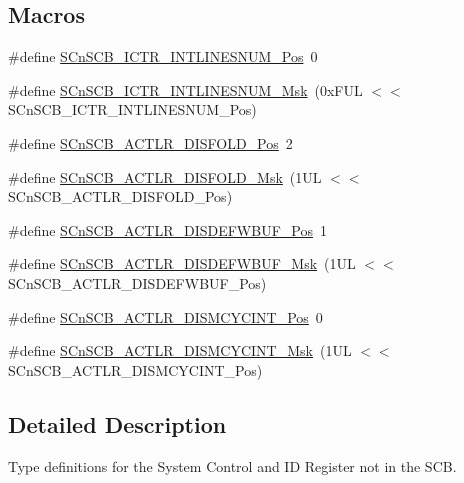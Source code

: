 \subsection*{Macros}
\begin{DoxyCompactItemize}
\item 
\#define \hyperlink{group__CMSIS__SCnSCB_ga0777ddf379af50f9ca41d40573bfffc5}{S\-Cn\-S\-C\-B\-\_\-\-I\-C\-T\-R\-\_\-\-I\-N\-T\-L\-I\-N\-E\-S\-N\-U\-M\-\_\-\-Pos}~0
\item 
\#define \hyperlink{group__CMSIS__SCnSCB_ga3efa0f5210051464e1034b19fc7b33c7}{S\-Cn\-S\-C\-B\-\_\-\-I\-C\-T\-R\-\_\-\-I\-N\-T\-L\-I\-N\-E\-S\-N\-U\-M\-\_\-\-Msk}~(0x\-F\-U\-L $<$$<$ S\-Cn\-S\-C\-B\-\_\-\-I\-C\-T\-R\-\_\-\-I\-N\-T\-L\-I\-N\-E\-S\-N\-U\-M\-\_\-\-Pos)
\item 
\#define \hyperlink{group__CMSIS__SCnSCB_gaab395870643a0bee78906bb15ca5bd02}{S\-Cn\-S\-C\-B\-\_\-\-A\-C\-T\-L\-R\-\_\-\-D\-I\-S\-F\-O\-L\-D\-\_\-\-Pos}~2
\item 
\#define \hyperlink{group__CMSIS__SCnSCB_gaa9dd2d4a2350499188f438d0aa9fd982}{S\-Cn\-S\-C\-B\-\_\-\-A\-C\-T\-L\-R\-\_\-\-D\-I\-S\-F\-O\-L\-D\-\_\-\-Msk}~(1\-U\-L $<$$<$ S\-Cn\-S\-C\-B\-\_\-\-A\-C\-T\-L\-R\-\_\-\-D\-I\-S\-F\-O\-L\-D\-\_\-\-Pos)
\item 
\#define \hyperlink{group__CMSIS__SCnSCB_gafa2eb37493c0f8dae77cde81ecf80f77}{S\-Cn\-S\-C\-B\-\_\-\-A\-C\-T\-L\-R\-\_\-\-D\-I\-S\-D\-E\-F\-W\-B\-U\-F\-\_\-\-Pos}~1
\item 
\#define \hyperlink{group__CMSIS__SCnSCB_ga6cda7b7219232a008ec52cc8e89d5d08}{S\-Cn\-S\-C\-B\-\_\-\-A\-C\-T\-L\-R\-\_\-\-D\-I\-S\-D\-E\-F\-W\-B\-U\-F\-\_\-\-Msk}~(1\-U\-L $<$$<$ S\-Cn\-S\-C\-B\-\_\-\-A\-C\-T\-L\-R\-\_\-\-D\-I\-S\-D\-E\-F\-W\-B\-U\-F\-\_\-\-Pos)
\item 
\#define \hyperlink{group__CMSIS__SCnSCB_gaaa3e79f5ead4a32c0ea742b2a9ffc0cd}{S\-Cn\-S\-C\-B\-\_\-\-A\-C\-T\-L\-R\-\_\-\-D\-I\-S\-M\-C\-Y\-C\-I\-N\-T\-\_\-\-Pos}~0
\item 
\#define \hyperlink{group__CMSIS__SCnSCB_ga2a2818f0489ad10b6ea2964e899d4cbc}{S\-Cn\-S\-C\-B\-\_\-\-A\-C\-T\-L\-R\-\_\-\-D\-I\-S\-M\-C\-Y\-C\-I\-N\-T\-\_\-\-Msk}~(1\-U\-L $<$$<$ S\-Cn\-S\-C\-B\-\_\-\-A\-C\-T\-L\-R\-\_\-\-D\-I\-S\-M\-C\-Y\-C\-I\-N\-T\-\_\-\-Pos)
\end{DoxyCompactItemize}


\subsection{Detailed Description}
Type definitions for the System Control and I\-D Register not in the S\-C\-B. 

